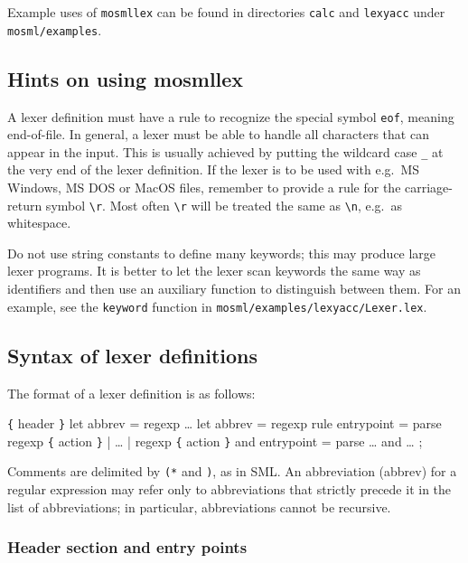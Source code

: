 \documentclass[fleqn,a4paper]{article}
\begin{document}
Example uses of {\tt mosmllex} can be found in directories {\tt calc}
and {\tt lexyacc} under {\tt mosml/examples}.


\subsection{Hints on using mosmllex}

A lexer definition must have a rule to recognize the special symbol
{\tt eof}, meaning end-of-file.  In general, a lexer must be able to
handle all characters that can appear in the input.  This is usually
achieved by putting the wildcard case \verb#_# at the very end of the
lexer definition.  If the lexer is to be used with e.g.\ MS Windows,
MS DOS or MacOS files, remember to provide a rule for the
carriage-return symbol \verb#\r#.  Most often \verb#\r# will be
treated the same as \verb#\n#, e.g.\ as whitespace.

Do not use string constants to define many keywords; this may produce
large lexer programs.  It is better to let the lexer scan keywords the
same way as identifiers and then use an auxiliary function to
distinguish between them.  For an example, see the {\tt keyword}
function in {\tt mosml/examples/lexyacc/Lexer.lex}.


\subsection{Syntax of lexer definitions}

The format of a lexer definition is as follows:

\begin{program}
\verb#{# {\rm header} \verb#}#
let {\rm abbrev} = {\rm regexp}
\ldots
let {\rm abbrev} = {\rm regexp}
rule {\rm entrypoint} =
  parse {\rm regexp} \verb#{# {\rm action} \verb#}#
      | \ldots
      | {\rm regexp} \verb#{# {\rm action} \verb#}#
and {\rm entrypoint} =
  parse \ldots
and \ldots
;
\end{program}

\noindent Comments are delimited by {\tt (*} and {\tt *)}, as in
SML\@.  An abbreviation (abbrev) for a regular expression may refer
only to abbreviations that strictly precede it in the list of
abbreviations; in particular, abbreviations cannot be recursive.


\subsubsection{Header section and entry points}
\end{document}
